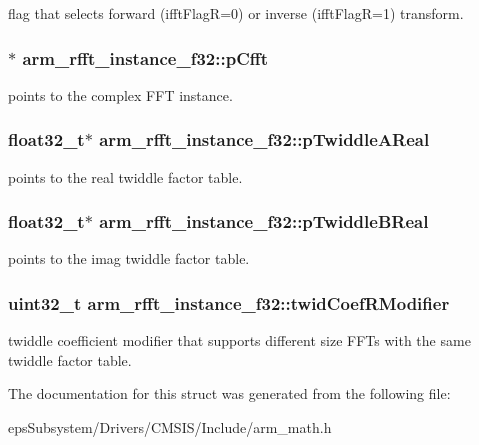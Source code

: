 flag that selects forward (ifft\-Flag\-R=0) or inverse (ifft\-Flag\-R=1) transform. \hypertarget{structarm__rfft__instance__f32_a9f47ba9f50c81e4445ae3827b981bc05}{
\subsubsection[{p\-Cfft}]{$\ast$ arm\-\_\-rfft\-\_\-instance\-\_\-f32\-::p\-Cfft}}\label{structarm__rfft__instance__f32_a9f47ba9f50c81e4445ae3827b981bc05}
points to the complex F\-F\-T instance. \hypertarget{structarm__rfft__instance__f32_a534cc7e6e9b3e3dd022fad611c762142}{
\subsubsection[{p\-Twiddle\-A\-Real}]{\setlength{\rightskip}{0pt plus 5cm}float32\-\_\-t$\ast$ arm\-\_\-rfft\-\_\-instance\-\_\-f32\-::p\-Twiddle\-A\-Real}}\label{structarm__rfft__instance__f32_a534cc7e6e9b3e3dd022fad611c762142}
points to the real twiddle factor table. \hypertarget{structarm__rfft__instance__f32_a23543ecfd027fea2477fe1eea23c3c4d}{
\subsubsection[{p\-Twiddle\-B\-Real}]{\setlength{\rightskip}{0pt plus 5cm}float32\-\_\-t$\ast$ arm\-\_\-rfft\-\_\-instance\-\_\-f32\-::p\-Twiddle\-B\-Real}}\label{structarm__rfft__instance__f32_a23543ecfd027fea2477fe1eea23c3c4d}
points to the imag twiddle factor table. \hypertarget{structarm__rfft__instance__f32_aede85350fb5ae6baa1b3e8bfa15b18d6}{
\subsubsection[{twid\-Coef\-R\-Modifier}]{\setlength{\rightskip}{0pt plus 5cm}uint32\-\_\-t arm\-\_\-rfft\-\_\-instance\-\_\-f32\-::twid\-Coef\-R\-Modifier}}\label{structarm__rfft__instance__f32_aede85350fb5ae6baa1b3e8bfa15b18d6}
twiddle coefficient modifier that supports different size F\-F\-Ts with the same twiddle factor table. 

The documentation for this struct was generated from the following file\-:\begin{DoxyCompactItemize}
\item 
eps\-Subsystem/\-Drivers/\-C\-M\-S\-I\-S/\-Include/arm\-\_\-math.\-h\end{DoxyCompactItemize}
